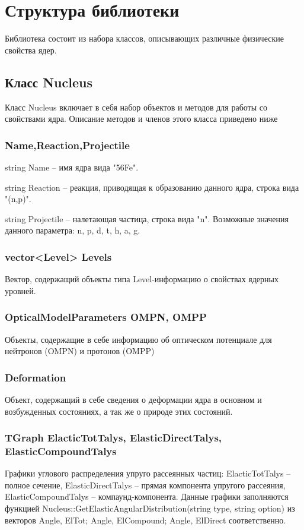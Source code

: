 \documentclass[a4paper,12pt]{extarticle}
\begin{document}
\section{Структура библиотеки}
Библиотека состоит из набора классов, описывающих различные физические свойства ядер. 
\subsection{Класс Nucleus}
Класс Nucleus включает в себя набор объектов и методов для работы со свойствами ядра. Описание методов и членов этого класса приведено ниже
\subsubsection{Name,Reaction,Projectile}
string Name -- имя ядра вида "56Fe".

string Reaction -- реакция, приводящая к образованию данного ядра, строка вида "(n,p)".

string Projectile -- налетающая частица, строка вида "n". Возможные значения данного параметра: n, p, d, t, h, a, g.
\subsubsection{vector<Level> Levels}
Вектор, содержащий объекты типа Level-информацию о свойствах ядерных уровней.
\subsubsection{OpticalModelParameters OMPN, OMPP}
Объекты, содержащие в себе информацию об оптическом потенциале для нейтронов (OMPN) и протонов (OMPP)
\subsubsection{Deformation}
Объект, содержащий в себе сведения о деформации ядра в основном и возбужденных состояниях, а так же о природе этих состояний.
\subsubsection{TGraph ElacticTotTalys, ElasticDirectTalys, ElasticCompoundTalys}
Графики углового распределения упруго рассеянных частиц:  ElacticTotTalys -- полное сечение, ElasticDirectTalys -- прямая компонента упругого рассеяния, ElasticCompoundTalys -- компаунд-компонента. Данные графики заполняются функцией Nucleus::GetElasticAngularDistribution(string type, string option) из векторов Angle, ElTot; Angle, ElCompound; Angle, ElDirect соответственно.
\end{document}

